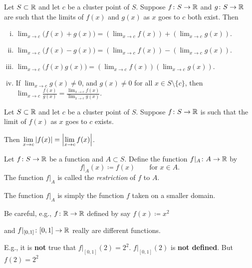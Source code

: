 \documentclass[10pt,aspectratio=149]{beamer}
\begin{document}
\begin{frame}

\begin{corollary}
Let $S \subset {\mathbb{R}}$ and let $c$ be a cluster point of $S$.  
Suppose $f \colon S \to {\mathbb{R}}$ and
$g \colon S \to {\mathbb{R}}$ are 
such that 
the limits of $f(x)$ and $g(x)$ as $x$ goes to $c$ both exist.
\pause
Then
\begin{enumerate}[(i)]
\item
$\displaystyle
\lim_{x\to c} \bigl(f(x)+g(x)\bigr) = \left(\lim_{x\to c} f(x)\right) + 
\left(\lim_{x\to c} g(x)\right) .
$
\item
\pause
$\displaystyle
\lim_{x\to c} \bigl(f(x)-g(x)\bigr) = \left(\lim_{x\to c} f(x)\right) -
\left(\lim_{x\to c} g(x)\right) .
$
\item
\pause
$\displaystyle
\lim_{x\to c} \bigl(f(x)g(x)\bigr) = \left(\lim_{x\to c} f(x)\right)
\left(\lim_{x\to c} g(x)\right) .
$
\item\pause\label{falg:cor:iv}
If
$\displaystyle \lim_{x\to c} g(x) \not= 0$,
and $g(x) \not= 0$ for all $x \in S \setminus \{ c \}$, then
$\displaystyle
\lim_{x\to c} \frac{f(x)}{g(x)} =
\frac{\lim_{x\to c} f(x)}{\lim_{x\to c} g(x)}$.
\end{enumerate}
\end{corollary}

\pause
\begin{corollary}
Let $S \subset {\mathbb{R}}$ and let $c$ be a cluster point of $S$.
Suppose $f \colon S \to {\mathbb{R}}$ is such that the limit of $f(x)$ as $x$ goes to $c$
exists.

\pause
\medskip

Then
\quad
$\displaystyle
\lim_{x\to c} \left\lvert {f(x)} \right\rvert =
\left\lvert {\lim_{x\to c} f(x)} \right\rvert$.
\end{corollary}

\end{frame}

\begin{frame}

\begin{definition}
Let $f \colon S \to {\mathbb{R}}$ be a function and $A \subset S$.  Define the
function $f|_A \colon A \to {\mathbb{R}}$ by
\begin{equation*}
f|_A (x) \coloneqq f(x)  \qquad \text{for } x \in A.
\end{equation*}
\pause
The function
$f|_A$ is called the \emph{restriction} of $f$ to $A$.
\end{definition}

\pause
The function $f|_A$ is simply the function $f$ taken on a smaller domain.

\pause
\medskip

Be careful, e.g., $f \colon {\mathbb{R}} \to {\mathbb{R}}$ defined by say $f(x) \coloneqq x^2$

and $f|_{[0,1]} \colon [0,1] \to {\mathbb{R}}$ really are different functions.

\pause
\medskip

E.g., it is \textbf{not} true that $f|_{[0,1]}(2) = 2^2$.
\quad $f|_{[0,1]}(2)$ is
\textbf{not defined}. \quad But $f(2)=2^2$

\end{frame}
\end{document}
